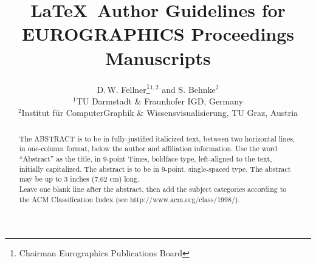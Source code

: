 

\title[EG \LaTeX\ Author Guidelines]%
      {\LaTeX\ Author Guidelines for EUROGRAPHICS Proceedings Manuscripts}

\author[D. Fellner \& S. Behnke]
       {D.\,W. Fellner\thanks{Chairman Eurographics Publications Board}$^{1,2}$
        and S. Behnke$^{2}$
        \\
         $^1$TU Darmstadt \& Fraunhofer IGD, Germany\\
         $^2$Institut f{\"u}r ComputerGraphik \& Wissensvisualisierung, TU Graz, Austria
       }


%





\maketitle

\begin{abstract}
   The ABSTRACT is to be in fully-justified italicized text,
   between two horizontal lines,
   in one-column format,
   below the author and affiliation information.
   Use the word ``Abstract'' as the title, in 9-point Times, boldface type,
   left-aligned to the text, initially capitalized.
   The abstract is to be in 9-point, single-spaced type.
   The abstract may be up to 3 inches (7.62 cm) long. \\
   Leave one blank line after the abstract,
   then add the subject categories according to the ACM Classification Index
   (see http://www.acm.org/class/1998/).

\begin{classification} %
\end{classification}

\end{abstract}





